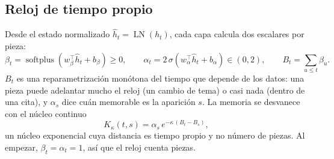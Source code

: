 \documentclass[11pt]{article}
\DeclareMathOperator{\softplus}{softplus}
\DeclareMathOperator{\LN}{LN}
\begin{document}
\subsection{Reloj de tiempo propio}
\label{sec:clock}
Desde el estado normalizado $\hat h_t=\LN(h_t)$, cada capa calcula dos escalares por pieza:
\begin{equation}
\beta_t=\softplus(w_\beta^\top\hat h_t+b_\beta)\ge0,\qquad
\alpha_t=2\,\sigma(w_\alpha^\top\hat h_t+b_\alpha)\in(0,2),\qquad
B_t=\sum_{u\le t}\beta_u .
\label{eq:clock}
\end{equation}
$B_t$ es una reparametrización monótona del tiempo que depende de los datos: una pieza puede adelantar mucho el reloj
(un cambio de tema) o casi nada (dentro de una cita), y $\alpha_s$ dice cuán memorable es la aparición $s$. La memoria
se desvanece con el núcleo continuo
\begin{equation}
K_\kappa(t,s)=\alpha_s\,e^{-\kappa\,(B_t-B_s)},
\label{eq:kernel}
\end{equation}
un núcleo exponencial cuya distancia es tiempo propio y no número de piezas. Al empezar, $\beta_t=\alpha_t=1$, así que
el reloj cuenta piezas.
\end{document}
